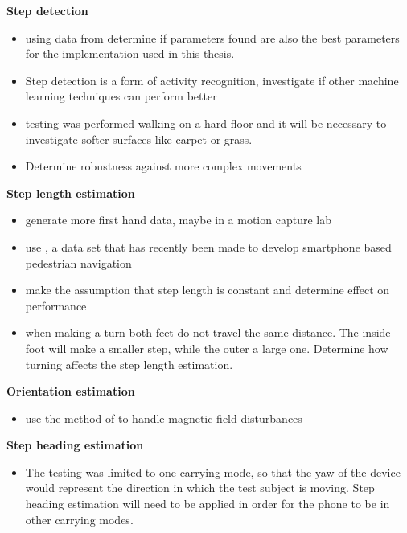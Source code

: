 {\color{purple}
\textbf{Step detection}
\begin{itemize}
	\item using data from \cite{Salvi2018} determine if parameters found are also the best parameters for the implementation used in this thesis.
	\item Step detection is a form of activity recognition, investigate if other machine learning techniques can perform better  
	\item testing was performed walking on a hard floor and it will be necessary to investigate softer surfaces like carpet or grass.
	\item Determine robustness against more complex movements
\end{itemize}

\textbf{Step length estimation}
\begin{itemize}
	\item generate more first hand data, maybe in a motion capture lab  
	\item use \cite{Bayev2019}, a data set that has recently been made to develop smartphone based pedestrian navigation 
	\item make the assumption that step length is constant and determine effect on performance
	\item when making a turn both feet do not travel the same distance. The inside foot will make a smaller step, while the outer a large one. Determine how turning affects the step length estimation.
\end{itemize}

\textbf{Orientation estimation}
\begin{itemize}
	\item use the method of \cite{Michel2018} to handle magnetic field disturbances
\end{itemize}

\textbf{Step heading estimation}
\begin{itemize}
	\item The testing was limited to one carrying mode, so that the yaw of the device would represent the direction in which the test subject is moving. Step heading estimation will need to be applied in order for the phone to be in other carrying modes.
\end{itemize}

}
